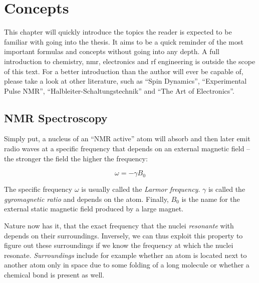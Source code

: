 \chapter{Concepts}

This chapter will quickly introduce the topics the reader is expected to be familiar with going into the thesis. It aims to be a quick reminder of the most important formulas and concepts without going into any depth. A full introduction to chemistry, \acrshort{nmr}, electronics and \acrshort{rf} engineering is outside the scope of this text. For a better introduction than the author will ever be capable of, please take a look at other literature, such as \enquote{Spin Dynamics}, \enquote{Experimental Pulse NMR}, \enquote{Halbleiter-Schaltungstechnik} and \enquote{The Art of Electronics}.

\section{NMR Spectroscopy}
Simply put, a nucleus of an \enquote{NMR active} atom will absorb and then later emit radio waves at a specific frequency that depends on an external magnetic field -- the stronger the field the higher the frequency:

\[
    \omega = -\gamma{}B_0
\]

The specific frequency \(\omega\) is usually called the \emph{Larmor frequency}. \(\gamma\) is called the \emph{gyromagnetic ratio} and depends on the atom. Finally, \(B_0\) is the name for the external static magnetic field produced by a large magnet.

Nature now has it, that the exact frequency that the nuclei \emph{resonante} with depends on their surroundings. Inversely, we can thus exploit this property to figure out these surroundings if we know the frequency at which the nuclei resonate. \emph{Surroundings} include for example whether an atom is located next to another atom only in space due to some folding of a long molecule or whether a chemical bond is present as well.

